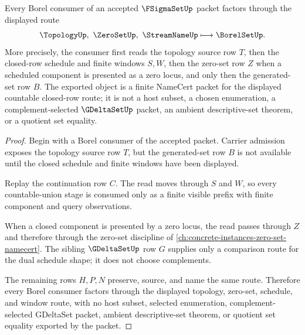 \begin{theorem}
\label{thm:f-sigma-set-borel-handoff}
Every Borel consumer of an accepted $\FSigmaSetUp$ packet factors through the displayed route
$$
\TopologyUp,\ \ZeroSetUp,\ \StreamNameUp
\longmapsto
\BorelSetUp .
$$
More precisely, the consumer first reads the topology source row $T$, then the closed-row schedule and finite windows $S,W$, then the zero-set row $Z$ when a scheduled component is presented as a zero locus, and only then the generated-set row $B$. The exported object is a finite NameCert packet for the displayed countable closed-row route; it is not a host subset, a chosen enumeration, a complement-selected $\GDeltaSetUp$ packet, an ambient descriptive-set theorem, or a quotient set equality.
\end{theorem}
\begin{proof}
Begin with a Borel consumer of the accepted packet. Carrier admission exposes the topology source row $T$, but the generated-set row $B$ is not available until the closed schedule and finite windows have been displayed.

Replay the continuation row $C$. The read moves through $S$ and $W$, so every countable-union stage is consumed only as a finite visible prefix with finite component and query observations.

When a closed component is presented by a zero locus, the read passes through $Z$ and therefore through the zero-set discipline of \autoref{ch:concrete-instances-zero-set-namecert}. The sibling $\GDeltaSetUp$ row $G$ supplies only a comparison route for the dual schedule shape; it does not choose complements.

The remaining rows $H,P,N$ preserve, source, and name the same route. Therefore every Borel consumer factors through the displayed topology, zero-set, schedule, and window route, with no host subset, selected enumeration, complement-selected GDeltaSet packet, ambient descriptive-set theorem, or quotient set equality exported by the packet.
\end{proof}


